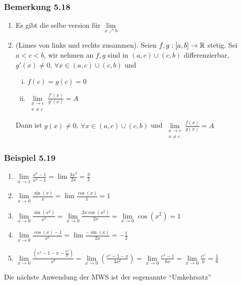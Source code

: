 \subsubsection*{Bemerkung 5.18}
\begin{enumerate}
\item Es gibt die selbe version für $\mathop {\lim }\limits_{x \nearrow b} $
\item (Limes von links und rechts zusammen). Seien $f,g:\lbrack a,b\rbrack\to\mathbb{R}$ stetig. Sei $a<c<b$, wir nehmen an $f,g$ sind in $\left( {a,c} \right) \cup \left( {c,b} \right)$ differenzierbar, $g'(x)\not=0$, $\forall x\in\left( {a,c} \right) \cup \left( {c,b} \right)$ und
\begin{enumerate}[(i)]
\item $f(c)=g(c)=0$
\item $\mathop {\lim }\limits_{\begin{array}{*{20}{c}}
{x \to c}\\
{x\not  = c}
\end{array}} \frac{{f'\left( x \right)}}{{g'\left( x \right)}} = A$
\end{enumerate}
Dann ist $g(x)\not=0$, $\forall x\in\left( {a,c} \right) \cup \left( {c,b} \right)$ und $\mathop {\lim }\limits_{\begin{array}{*{20}{c}}
{x \to c}\\
{x\not  = c}
\end{array}} \frac{{f\left( x \right)}}{{g\left( x \right)}} = A$
\end{enumerate}

\subsubsection*{Beispiel 5.19}
\begin{enumerate}
\item $\mathop {\lim }\limits_{x \to 1} \frac{{{x^3} - 1}}{{{x^2} - 1}} = \lim \frac{{3{x^2}}}{{2x}} = \frac{3}{2}$
\item $\mathop {\lim }\limits_{x \to 0} \frac{{\sin \left( x \right)}}{x} = \lim \frac{{\cos \left( x \right)}}{1} = 1$
\item $\mathop {\lim }\limits_{x \to 0} \frac{{\sin \left( {{x^2}} \right)}}{{{x^2}}} = \mathop {\lim }\limits_{x \to 0} \frac{{2x\cos \left( {{x^2}} \right)}}{{2x}} = \mathop {\lim }\limits_{x \to 0} \cos \left( {{x^2}} \right) = 1$
\item $\mathop {\lim }\limits_{x \to 0} \frac{{\cos \left( x \right) - 1}}{{{x^2}}} = \lim \frac{{ - \sin \left( x \right)}}{{2x}} =  - \frac{1}{2}$
\item $\mathop {\lim }\limits_{x \to 0} \frac{{\left( {{e^x} - 1 - x - \frac{{{x^2}}}{{2!}}} \right)}}{{{x^3}}} = \mathop {\lim }\limits_{x \to 0} \left( {\frac{{{e^x} - 1 - x}}{{3{x^2}}}} \right) = \mathop {\lim }\limits_{x \to 0} \frac{{{e^x} - 1}}{{6x}} = \mathop {\lim }\limits_{x \to 0} \frac{{{e^x}}}{6} = \frac{1}{6}$
\end{enumerate}
Die nächste Anwendung der MWS ist der sogenannte ``Umkehrsatz''
